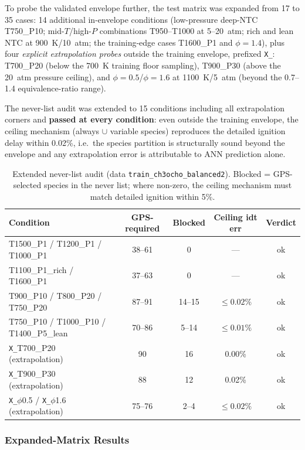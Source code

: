 \documentclass[11pt,a4paper]{article}
\begin{document}
To probe the validated envelope further, the test matrix was expanded from 17
to 35 cases: 14 additional in-envelope conditions (low-pressure deep-NTC
T750\_P10; mid-$T$/high-$P$ combinations T950--T1000 at 5--20~atm; rich and
lean NTC at 900~K/10~atm; the training-edge cases T1600\_P1 and
$\phi=1.4$), plus four \emph{explicit extrapolation probes} outside the
training envelope, prefixed \texttt{X\_}: T700\_P20 (below the 700~K training
floor sampling), T900\_P30 (above the 20~atm pressure ceiling), and
$\phi=0.5$/$\phi=1.6$ at 1100~K/5~atm (beyond the 0.7--1.4 equivalence-ratio
range).

The never-list audit was extended to 15 conditions including all extrapolation
corners and \textbf{passed at every condition}: even outside the training
envelope, the ceiling mechanism (always $\cup$ variable species) reproduces
the detailed ignition delay within 0.02\%, i.e.\ the species partition is
structurally sound beyond the envelope and any extrapolation error is
attributable to ANN prediction alone.

\begin{table}[H]
\centering
\caption{Extended never-list audit (data \texttt{train\_ch3ocho\_balanced2}). Blocked = GPS-selected species in the never list; where non-zero, the ceiling mechanism must match detailed ignition within 5\%.}
\label{tab:extended_audit}
\begin{tabular}{lcccc}
\toprule
\textbf{Condition} & \textbf{GPS-required} & \textbf{Blocked} & \textbf{Ceiling idt err} & \textbf{Verdict} \\
\midrule
T1500\_P1 / T1200\_P1 / T1000\_P1 & 38--61 & 0 & --- & ok \\
T1100\_P1\_rich / T1600\_P1 & 37--63 & 0 & --- & ok \\
T900\_P10 / T800\_P20 / T750\_P20 & 87--91 & 14--15 & $\leq 0.02\%$ & ok \\
T750\_P10 / T1000\_P10 / T1400\_P5\_lean & 70--86 & 5--14 & $\leq 0.01\%$ & ok \\
\texttt{X\_}T700\_P20 (extrapolation) & 90 & 16 & 0.00\% & ok \\
\texttt{X\_}T900\_P30 (extrapolation) & 88 & 12 & 0.02\% & ok \\
\texttt{X\_}$\phi$0.5 / \texttt{X\_}$\phi$1.6 (extrapolation) & 75--76 & 2--4 & $\leq 0.02\%$ & ok \\
\bottomrule
\end{tabular}
\end{table}

\subsubsection{Expanded-Matrix Results}
\end{document}
